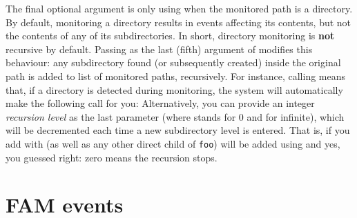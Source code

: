 The final optional argument is only using when the monitored path is a
directory. By default, monitoring a directory results in events
affecting its contents, but not the contents of any of its
subdirectories. In short, directory monitoring is \textbf{not}
recursive by default. Passing  as the last (fifth) argument of
 modifies this behaviour: any subdirectory
found (or subsequently created) inside the original path is added to
list of monitored paths, recursively. For instance,
calling
means that, if a directory  is detected during
monitoring, the system will automatically make the following call for
you:
Alternatively, you can provide an integer \textit{recursion level} as
the last parameter (where  stands for 0 and  for
infinite), which will be decremented each time a new subdirectory
level is entered. That is, if you add  with
 (as well as any other direct child of
\texttt{foo}) will be added using
and yes, you guessed right: zero means the recursion stops.

\section{FAM events}
\label{sec:fam-events}




